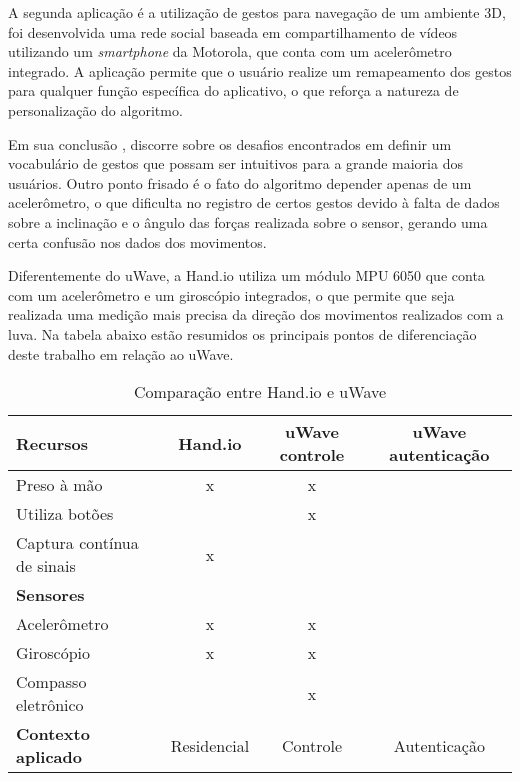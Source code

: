 A segunda aplicação é a utilização de gestos para navegação de um ambiente 3D, foi desenvolvida uma rede social baseada em compartilhamento de vídeos utilizando um \textit{smartphone} da Motorola, que conta com um acelerômetro integrado. A aplicação permite que o usuário realize um remapeamento dos gestos para qualquer função específica do aplicativo, o que reforça a natureza de personalização do algoritmo.

Em sua conclusão , discorre sobre os desafios encontrados em definir um vocabulário de gestos que possam ser intuitivos para a grande maioria dos usuários. Outro ponto frisado é o fato do algoritmo depender apenas de um acelerômetro, o que dificulta no registro de certos gestos devido à falta de dados sobre a inclinação e o ângulo das forças realizada sobre o sensor, gerando uma certa confusão nos dados dos movimentos.

Diferentemente do uWave, a Hand.io utiliza um módulo MPU 6050 que conta com um acelerômetro e um giroscópio integrados, o que permite que seja realizada uma medição mais precisa da direção dos movimentos realizados com a luva. Na tabela abaixo estão resumidos os principais pontos de diferenciação deste trabalho em relação ao uWave.

\begin{table}[ht]
	\centering
    \caption{Comparação entre Hand.io e uWave}
    \label{tab:comp_uwave}
	\begin{tabular}{|l|c|c|c|}
    	\hline
		\textbf{Recursos} & \textbf{Hand.io} & \textbf{uWave controle} & \textbf{uWave autenticação} \\
        \hline
        \hline
        Preso à mão & x & x & \\
        \hline
        Utiliza botões &  & x & \\
        \hline
        Captura contínua de sinais & x & & \\
        \hline
        \hline
        \textbf{Sensores} & & & \\
        \hline
        \hline
        Acelerômetro & x & x & \\
        \hline
        Giroscópio & x & x & \\
        \hline
        Compasso eletrônico & & x & \\
        \hline
        \hline
        \textbf{Contexto aplicado} & Residencial & Controle & Autenticação\\
        \hline
	\end{tabular}

\end{table}









